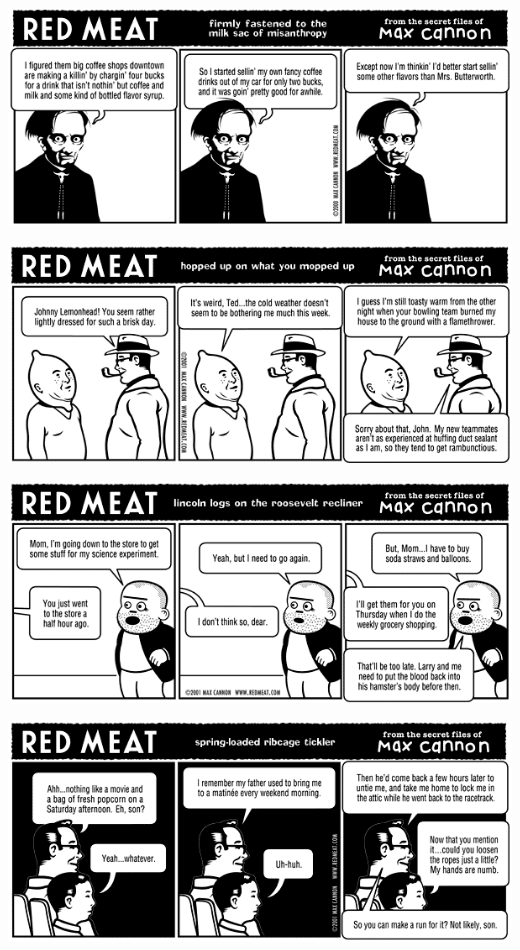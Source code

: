 \documentclass[a4paper,twoside,11pt]{article}
\begin{document}
\includegraphics[width=\textwidth]{redmeat_2001-01-23.png}



\includegraphics[width=\textwidth]{redmeat_2001-01-30.png}



\includegraphics[width=\textwidth]{redmeat_2001-02-06.png}



\includegraphics[width=\textwidth]{redmeat_2001-02-13.png}
\end{document}
